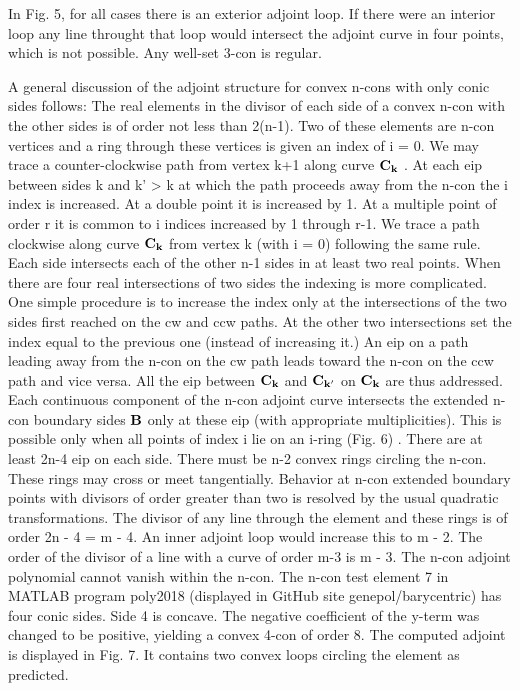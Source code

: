 \documentclass{article}
\begin{document}
In Fig. 5, for all cases there is an exterior adjoint loop.  If there were an interior loop any line throught that loop would intersect the adjoint curve in four points, which is not possible.  Any well-set 3-con is regular. 
\par
A general discussion of the adjoint structure for convex n-cons with only conic sides follows:
The real elements in the divisor of each side of a convex n-con with the other sides is of order not less than 2(n-1).  Two of these elements are n-con vertices and a ring through these vertices is given an index of i = 0.  We may trace a counter-clockwise path from vertex k+1 along curve $\bf{C_k}$ .  At each eip between sides k and k' > k at which the path proceeds away from the n-con the i index is increased.  At a double point it is increased by 1.  At a multiple point of order r it is common to i indices increased by 1 through r-1.  We trace a path clockwise along curve $\bf{C_k}$ from vertex k (with i = 0) following the same rule.  Each side intersects each of the other n-1 sides in at least two real points.  When there are four real intersections of two sides the indexing is more complicated.  One simple procedure is to increase the index only at the intersections of the two sides first reached on the cw and ccw paths.  At the other two intersections set the index equal to the previous one (instead of increasing it.) An eip on a path leading away from the n-con on the cw path leads toward the n-con on the ccw path and vice versa.  All the eip between $\bf{C_k}$ and $\bf{C_{k'}}$ on $\bf{C_k}$ are thus addressed.  Each continuous component of the n-con adjoint curve intersects the extended n-con boundary sides $\bf{B}$ only at these eip (with appropriate multiplicities).  This is possible only when all points of index i lie on an i-ring (Fig. 6) .  There are at least 2n-4 eip on each side.  There must be n-2 convex rings circling the n-con.  These rings may cross or meet tangentially.  Behavior at n-con extended boundary points with divisors of order greater than two is resolved by the usual quadratic transformations.  The divisor of any line through the element and these rings is of order 2n - 4 = m - 4.  An inner adjoint loop would increase this to m - 2.  The  order of the divisor of a line with a curve of order m-3 is m - 3.   The n-con adjoint polynomial cannot vanish within the n-con.   The n-con test element 7 in MATLAB program poly2018 (displayed in GitHub site genepol/barycentric) has four conic sides.  Side 4 is concave.  The negative coefficient of the y-term was changed to be positive, yielding a convex 4-con of order 8.  The computed adjoint is displayed in Fig. 7.  It contains two convex loops circling the element as predicted. 
\end{document}
